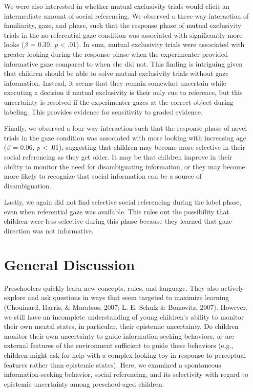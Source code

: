 \documentclass[10pt, letterpaper]{article}
\begin{document}
We were also interested in whether mutual exclusivity trials would
elicit an intermediate amount of social referencing. We observed a
three-way interaction of familiarity, gaze, and phase, such that the
response phase of mutual exclusivity trials in the no-referential-gaze
condition was associated with significantly more looks (\(\beta\) =
0.39, \emph{p} \textless{} .01). In sum, mutual exclusivity trials were
associated with greater looking during the response phase when the
experimenter provided informative gaze compared to when she did not.
This finding is intriguing given that children should be able to solve
mutual exclusivity trials without gaze information. Instead, it seems
that they remain somewhat uncertain while executing a decision if mutual
exclusivity is their only cue to reference, but this uncertainty is
resolved if the experimenter gazes at the correct object during
labeling. This provides evidence for sensitivity to graded evidence.

Finally, we observed a four-way interaction such that the response phase
of novel trials in the gaze condition was associated with more looking
with increasing age (\(\beta\) = 0.06, \emph{p} \textless{} .01),
suggesting that children may become more selective in their social
referencing as they get older. It may be that children improve in their
ability to monitor the need for disambiguating information, or they may
become more likely to recognize that social information can be a source
of disambiguation.

Lastly, we again did not find selective social referencing during the
label phase, even when referential gaze was available. This rules out
the possibility that children were less selective during this phase
because they learned that gaze direction was not informative.

\section{General Discussion}\label{general-discussion}

Preschoolers quickly learn new concepts, rules, and language. They also
actively explore and ask questions in ways that seem targeted to
maximize learning (Chouinard, Harris, \& Maratsos, 2007; L. E. Schulz \&
Bonawitz, 2007). However, we still have an incomplete understanding of
young children's ability to monitor their own mental states, in
particular, their epistemic uncertainty. Do children monitor their own
uncertainty to guide information-seeking behaviors, or are external
features of the environment sufficient to guide these behaviors (e.g.,
children might ask for help with a complex looking toy in response to
perceptual features rather than epistemic states). Here, we examined a
spontaneous information-seeking behavior, social referencing, and its
selectivity with regard to epistemic uncertainty among preschool-aged
children.
\end{document}
